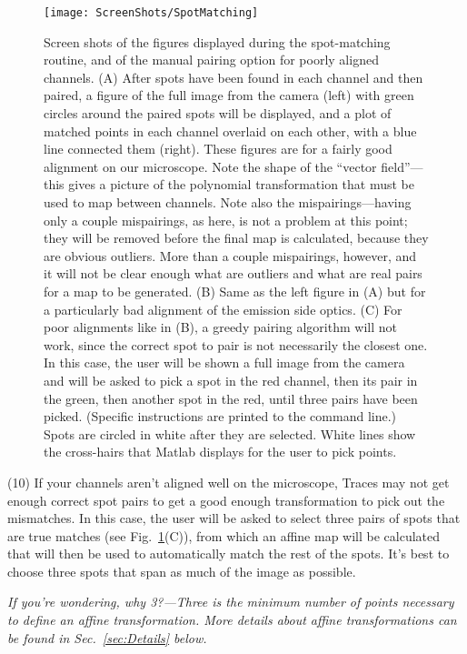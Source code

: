 \documentclass[11pt]{article}
\begin{document}
\begin{figure}
\begin{center}
\texttt{[image: ScreenShots/SpotMatching]}
\caption{Screen shots of the figures displayed during the spot-matching routine, and of the manual pairing option for poorly aligned channels. (A) After spots have been found in each channel and then paired, a figure of the full image from the camera (left) with green circles around the paired spots will be displayed, and a plot of matched points in each channel overlaid on each other, with a blue line connected them (right). These figures are for a fairly good alignment on our microscope. Note the shape of the ``vector field''---this gives a picture of the polynomial transformation that must be used to map between channels. Note also the mispairings---having only a couple mispairings, as here, is not a problem at this point; they will be removed before the final map is calculated, because they are obvious outliers.  More than a couple mispairings, however, and it will not be clear enough what are outliers and what are real pairs for a map to be generated. (B) Same as the left figure in (A) but for a particularly bad alignment of the emission side optics. (C) For poor alignments like in (B), a greedy pairing algorithm will not work, since the correct spot to pair is not necessarily the closest one.  In this case, the user will be shown a full image from the camera and will be asked to pick a spot in the red channel, then its pair in the green, then another spot in the red, until three pairs have been picked. (Specific instructions are printed to the command line.)  Spots are circled in white after they are selected.  White lines show the cross-hairs that Matlab displays for the user to pick points.}
\label{fig:PairingShot}
\end{center}
\end{figure}

\noindent (10) If your channels aren't aligned well on the microscope, Traces may not get enough correct spot pairs to get a good enough transformation to pick out the mismatches.  In this case, the user will be asked to select three pairs of spots that are true matches (see Fig.~\ref{fig:PairingShot}(C)), from which an affine map will be calculated that will then be used to automatically match the rest of the spots.  It's best to choose three spots that span as much of the image as possible.  

{\it If you're wondering, why 3?---Three is the minimum number of points necessary to define an affine transformation.  More details about affine transformations can be found in Sec.~\ref{sec:Details} below.}
\end{document}
